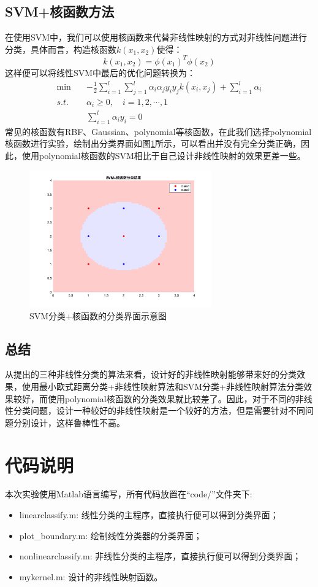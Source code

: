 \documentclass[cn]{elegantbook}
\begin{document}
\section{SVM+核函数方法}
在使用SVM中，我们可以使用核函数来代替非线性映射的方式对非线性问题进行分类，具体而言，构造核函数$k(x_1,x_2)$使得：
\begin{equation}
k(x_1,x_2)=\phi(x_1)^T\phi(x_2)
\end{equation}
这样便可以将线性SVM中最后的优化问题转换为：
\begin{equation}
\begin{aligned}
\min \quad&-\frac{1}{2}\sum_{i=1}^{l}\sum_{j=1}^l\alpha_i\alpha_jy_iy_jk(x_i,x_j)+\sum_{i=1}^l\alpha_i\\
s.t.\quad&\alpha_i\ge 0,\quad i=1,2,\cdots,1\\
&\sum_{i=1}^l\alpha_iy_i=0
\end{aligned}
\end{equation}
常见的核函数有RBF、Gaussian、polynomial等核函数，在此我们选择polynomial核函数进行实验，绘制出分类界面如图\ref{res7}所示，可以看出并没有完全分类正确，因此，使用polynomial核函数的SVM相比于自己设计非线性映射的效果更差一些。
\begin{figure}[!h]
	\centering
	\includegraphics[width=0.7\textwidth]{../results/non5}
	\caption{\label{res7}SVM分类+核函数的分类界面示意图}
\end{figure}

\section{总结}
从提出的三种非线性分类的算法来看，设计好的非线性映射能够带来好的分类效果，使用最小欧式距离分类+非线性映射算法和SVM分类+非线性映射算法分类效果较好，而使用polynomial核函数的分类效果就比较差了。因此，对于不同的非线性分类问题，设计一种较好的非线性映射是一个较好的方法，但是需要针对不同问题分别设计，这样鲁棒性不高。
\chapter{代码说明}
\noindent 本次实验使用Matlab语言编写，所有代码放置在“code/”文件夹下:
\begin{itemize}
	\item linearclassify.m: 线性分类的主程序，直接执行便可以得到分类界面；
	\item plot\_boundary.m: 绘制线性分类器的分类界面；
	\item nonlinearclassify.m: 非线性分类的主程序，直接执行便可以得到分类界面；
	\item mykernel.m: 设计的非线性映射函数。
\end{itemize}
\end{document}
